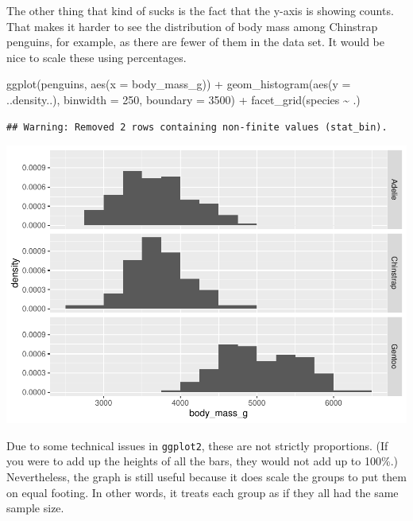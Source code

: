 \documentclass[
]{book}
\newenvironment{Shaded}{\begin{snugshade}}{\end{snugshade}}
\newcommand{\AttributeTok}[1]{\textcolor[rgb]{0.77,0.63,0.00}{#1}}
\newcommand{\DecValTok}[1]{\textcolor[rgb]{0.00,0.00,0.81}{#1}}
\newcommand{\FunctionTok}[1]{\textcolor[rgb]{0.00,0.00,0.00}{#1}}
\newcommand{\NormalTok}[1]{#1}
\newcommand{\SpecialCharTok}[1]{\textcolor[rgb]{0.00,0.00,0.00}{#1}}
\begin{document}
The other thing that kind of sucks is the fact that the y-axis is showing counts. That makes it harder to see the distribution of body mass among Chinstrap penguins, for example, as there are fewer of them in the data set. It would be nice to scale these using percentages.

\begin{Shaded}
\begin{Highlighting}[]
\FunctionTok{ggplot}\NormalTok{(penguins, }\FunctionTok{aes}\NormalTok{(}\AttributeTok{x =}\NormalTok{ body\_mass\_g)) }\SpecialCharTok{+}
    \FunctionTok{geom\_histogram}\NormalTok{(}\FunctionTok{aes}\NormalTok{(}\AttributeTok{y =}\NormalTok{ ..density..),}
                   \AttributeTok{binwidth =} \DecValTok{250}\NormalTok{, }\AttributeTok{boundary =} \DecValTok{3500}\NormalTok{) }\SpecialCharTok{+}
    \FunctionTok{facet\_grid}\NormalTok{(species }\SpecialCharTok{\textasciitilde{}}\NormalTok{ .)}
\end{Highlighting}
\end{Shaded}

\begin{verbatim}
## Warning: Removed 2 rows containing non-finite values (stat_bin).
\end{verbatim}

\includegraphics{intro_stats_files/figure-latex/unnamed-chunk-111-1.pdf}

Due to some technical issues in \texttt{ggplot2}, these are not strictly proportions. (If you were to add up the heights of all the bars, they would not add up to 100\%.) Nevertheless, the graph is still useful because it does scale the groups to put them on equal footing. In other words, it treats each group as if they all had the same sample size.
\end{document}
